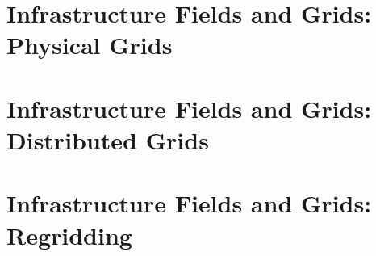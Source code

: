 \documentclass[english]{article}
\newcommand{\shortname}{GR}
\begin{document}


\newpage
\begin{htmlonly}
\end{htmlonly}
\part{Infrastructure Fields and Grids: Physical Grids}

\setcounter{section}{0}
\renewcommand{\thesection}{\shortname\arabic{section}}
\renewcommand{\thesubsection}{\shortname\arabic{section}.\arabic{subsection}}
\renewcommand{\thesubsubsection}{\shortname\arabic{section}.\arabic{subsection}.\arabic{subsubsection}}



\newpage
\begin{htmlonly}
\end{htmlonly}
\part{Infrastructure Fields and Grids: Distributed Grids}

\setcounter{section}{0}
\renewcommand{\thesection}{\shortname\arabic{section}}
\renewcommand{\thesubsection}{\shortname\arabic{section}.\arabic{subsection}}
\renewcommand{\thesubsubsection}{\shortname\arabic{section}.\arabic{subsection}.\arabic{subsubsection}}



\newpage
\begin{htmlonly}
\end{htmlonly}
\part{Infrastructure Fields and Grids: Regridding}

\setcounter{section}{0}
\renewcommand{\thesection}{\shortname\arabic{section}}
\renewcommand{\thesubsection}{\shortname\arabic{section}.\arabic{subsection}}
\renewcommand{\thesubsubsection}{\shortname\arabic{section}.\arabic{subsection}.\arabic{subsubsection}}


\end{document}
